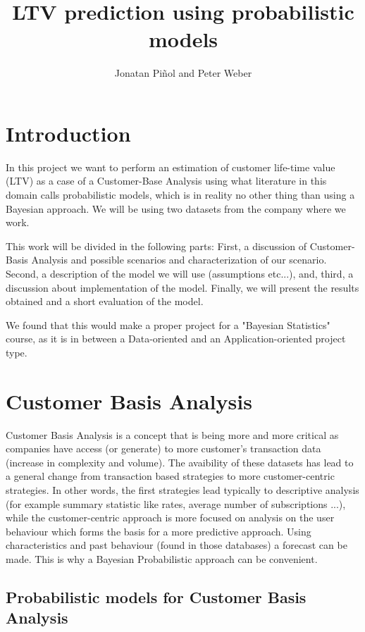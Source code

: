 \documentclass[paper=a4, fontsize=11pt]{scrartcl} %
\title{LTV prediction using probabilistic models}
\author{Jonatan Pi\~nol and Peter Weber}
\date{} %
\numberwithin{equation}{section} %
\numberwithin{figure}{section} %
\numberwithin{table}{section} %
\begin{document}
\maketitle
\tableofcontents

\newpage
\section{Introduction}

In this project we want to perform an estimation of customer life-time value (LTV) as a case of a Customer-Base Analysis using what literature in this domain calls probabilistic models, which is in reality no other thing than using a Bayesian approach. We will be using two datasets from the company where we work.

This work will be divided in the following parts: First, a discussion of Customer-Basis Analysis and possible scenarios and characterization of our scenario. Second, a description of the model we will use (assumptions etc...), and, third, a discussion about implementation of the model. Finally, we will present the results obtained and a short evaluation of the model.

We found that this would make a proper project for a "Bayesian Statistics" course, as it is in between a Data-oriented and an Application-oriented project type.

\section{Customer Basis Analysis}

Customer Basis Analysis is a concept that is being more and more critical as companies have access (or generate) to more customer's transaction data (increase in complexity and volume). The avaibility of these datasets has lead to a general change from transaction based strategies to more customer-centric strategies. In other words, the first strategies lead typically to descriptive analysis (for example summary statistic like rates, average number of subscriptions ...), while the customer-centric approach is more focused on analysis on the user behaviour which forms the basis for a more predictive approach. Using characteristics and past behaviour (found in those databases) a forecast can be made. This is why a Bayesian Probabilistic approach can be convenient.

\subsection{Probabilistic models for Customer Basis Analysis}
\end{document}
